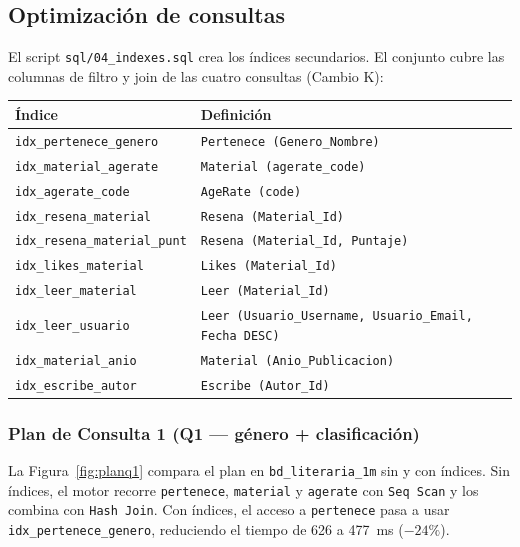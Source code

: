 \documentclass[12pt,a4paper]{article}
\begin{document}
\subsection{Optimización de consultas}

El script \texttt{sql/04\_indexes.sql} crea los índices secundarios. El
conjunto cubre las columnas de filtro y join de las cuatro consultas (Cambio K):

\begin{center}
\begin{tabular}{ll}
\toprule
\textbf{Índice} & \textbf{Definición} \\
\midrule
\texttt{idx\_pertenece\_genero}      & \texttt{Pertenece (Genero\_Nombre)} \\
\texttt{idx\_material\_agerate}      & \texttt{Material (agerate\_code)} \\
\texttt{idx\_agerate\_code}          & \texttt{AgeRate (code)} \\
\texttt{idx\_resena\_material}       & \texttt{Resena (Material\_Id)} \\
\texttt{idx\_resena\_material\_punt} & \texttt{Resena (Material\_Id, Puntaje)} \\
\texttt{idx\_likes\_material}        & \texttt{Likes (Material\_Id)} \\
\texttt{idx\_leer\_material}         & \texttt{Leer (Material\_Id)} \\
\texttt{idx\_leer\_usuario}          & \texttt{Leer (Usuario\_Username, Usuario\_Email, Fecha DESC)} \\
\texttt{idx\_material\_anio}         & \texttt{Material (Anio\_Publicacion)} \\
\texttt{idx\_escribe\_autor}         & \texttt{Escribe (Autor\_Id)} \\
\bottomrule
\end{tabular}
\end{center}


\subsubsection{Plan de Consulta 1 (Q1 --- género + clasificación)}

La Figura~\ref{fig:planq1} compara el plan en \texttt{bd\_literaria\_1m} sin y
con índices. Sin índices, el motor recorre \texttt{pertenece}, \texttt{material}
y \texttt{agerate} con \texttt{Seq Scan} y los combina con \texttt{Hash Join}.
Con índices, el acceso a \texttt{pertenece} pasa a usar
\texttt{idx\_pertenece\_genero}, reduciendo el tiempo de 626 a 477~ms ($-24\%$).
\end{document}
